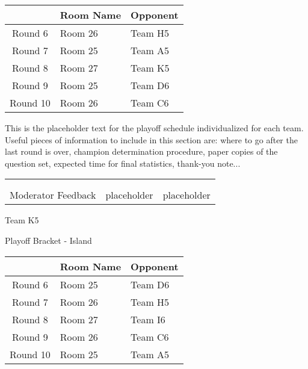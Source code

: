 \documentclass{article}%
\begin{document}
\vspace*{4pt}%
%
\begin{tabularx}{\textwidth}{|c|Y|Y|}%
\hline%
&Room Name&Opponent\\%
\hline%
Round 6&Room 26&Team H5\\%
Round 7&Room 25&Team A5\\%
Round 8&Room 27&Team K5\\%
Round 9&Room 25&Team D6\\%
Round 10&Room 26&Team C6\\%
\hline%
\end{tabularx}%
\vspace*{30pt}%
\linebreak%
This is the placeholder text for the playoff schedule individualized for each team. Useful pieces of information to include in this section are: where to go after the last round is over, champion determination procedure, paper copies of the question set, expected time for final statistics, thank{-}you note...%
\vspace*{30pt}%
\newline%
%
\begin{tabularx}{\textwidth}{YYY}%
  &  &  \\%
\\%
Moderator Feedback&placeholder&placeholder\\%
\end{tabularx}%
\newpage%
\begin{center}%
\begin{Huge}%
Team K5%
\end{Huge}%
\vspace*{12pt}%
\linebreak%
\begin{Large}%
Playoff Bracket {-} Island%
\end{Large}%
\end{center}%
\vspace*{4pt}%
%
\begin{tabularx}{\textwidth}{|c|Y|Y|}%
\hline%
&Room Name&Opponent\\%
\hline%
Round 6&Room 25&Team D6\\%
Round 7&Room 26&Team H5\\%
Round 8&Room 27&Team I6\\%
Round 9&Room 26&Team C6\\%
Round 10&Room 25&Team A5\\%
\hline%
\end{tabularx}%
\end{document}
